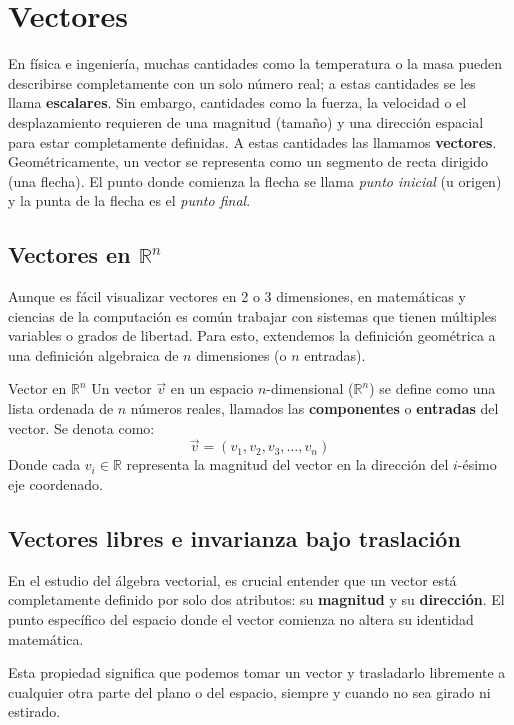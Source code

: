 \section{Vectores}

En física e ingeniería, muchas cantidades como la temperatura o la masa pueden describirse completamente con un solo número real; a estas cantidades se les llama \textbf{escalares}. Sin embargo, cantidades como la fuerza, la velocidad o el desplazamiento requieren de una magnitud (tamaño) y una dirección espacial para estar completamente definidas. A estas cantidades las llamamos \textbf{vectores}.
Geométricamente, un vector se representa como un segmento de recta dirigido (una flecha). El punto donde comienza la flecha se llama \textit{punto inicial} (u origen) y la punta de la flecha es el \textit{punto final}.

\subsection{Vectores en $\mathbb{R}^n$}

Aunque es fácil visualizar vectores en 2 o 3 dimensiones, en matemáticas y ciencias de la computación es común trabajar con sistemas que tienen múltiples variables o grados de libertad. Para esto, extendemos la definición geométrica a una definición algebraica de $n$ dimensiones (o $n$ entradas).

\begin{mydefinition}{Vector en $\mathbb{R}^n$}
Un vector $\vec{v}$ en un espacio $n$-dimensional ($\mathbb{R}^n$) se define como una lista ordenada de $n$ números reales, llamados las \textbf{componentes} o \textbf{entradas} del vector. Se denota como:
$$ \vec{v} = (v_1, v_2, v_3, \dots, v_n) $$
Donde cada $v_i \in \mathbb{R}$ representa la magnitud del vector en la dirección del $i$-ésimo eje coordenado.
\end{mydefinition}

\subsection{Vectores libres e invarianza bajo traslación}

En el estudio del álgebra vectorial, es crucial entender que un vector está completamente definido por solo dos atributos: su \textbf{magnitud} y su \textbf{dirección}. El punto específico del espacio donde el vector comienza no altera su identidad matemática.

Esta propiedad significa que podemos tomar un vector y trasladarlo libremente a cualquier otra parte del plano o del espacio, siempre y cuando no sea girado ni estirado. 

